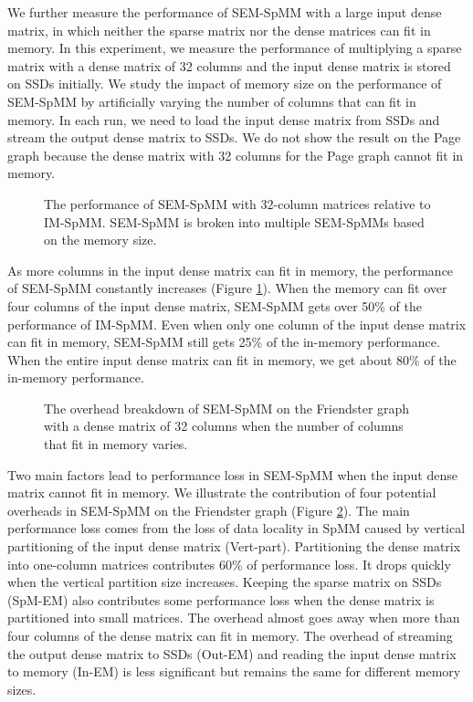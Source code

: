 We further measure the performance of SEM-SpMM with a large input dense matrix,
in which neither the sparse matrix nor the dense matrices can fit in memory.
In this experiment, we measure the performance of
multiplying a sparse matrix with a dense matrix of 32 columns and the input
dense matrix is stored on SSDs initially. We study the impact of memory size
on the performance of SEM-SpMM by artificially varying the number of columns
that can fit in memory. In each run, we need to load the input dense matrix from
SSDs and stream the output dense matrix to SSDs. We do not show the result on
the Page graph because the dense matrix with 32 columns for the Page graph
cannot fit in memory.

\begin{figure}
	\begin{center}
		\footnotesize
		
		\caption{The performance of SEM-SpMM with 32-column matrices
			relative to IM-SpMM. SEM-SpMM is broken into multiple SEM-SpMMs
		based on the memory size.}
		\label{perf:spmm32}
	\end{center}
\end{figure}

As more columns in the input dense matrix can fit in memory, the performance
of SEM-SpMM constantly increases (Figure \ref{perf:spmm32}). When the memory
can fit over four columns of the input dense matrix, SEM-SpMM gets over 50\%
of the performance of IM-SpMM. Even when only one column of the input dense
matrix can fit in memory, SEM-SpMM still gets 25\% of the in-memory performance.
When the entire input dense matrix can fit in memory, we get about 80\% of
the in-memory performance.

\begin{figure}
	\begin{center}
		\footnotesize
		
		\caption{The overhead breakdown of SEM-SpMM on the Friendster
			graph with a dense matrix of 32 columns when the number
			of columns that fit in memory varies. }
		\label{perf:spmm32_over}
	\end{center}
\end{figure}

Two main factors lead to performance loss in SEM-SpMM when the input dense matrix
cannot fit in memory. We illustrate the contribution of four potential overheads
in SEM-SpMM on the Friendster graph (Figure \ref{perf:spmm32_over}). The main
performance loss comes from the loss of data locality in SpMM caused by
vertical partitioning of the input dense matrix (Vert-part). Partitioning
the dense matrix into one-column matrices contributes 60\% of performance loss.
It drops quickly when the vertical
partition size increases. Keeping the sparse matrix on SSDs (SpM-EM)
also contributes some performance loss when the dense matrix is partitioned
into small matrices. The overhead almost goes away when more than four columns
of the dense matrix can fit in memory. The overhead of streaming the output dense
matrix to SSDs (Out-EM) and reading the input dense matrix to memory (In-EM)
is less significant but remains the same for different memory sizes.

